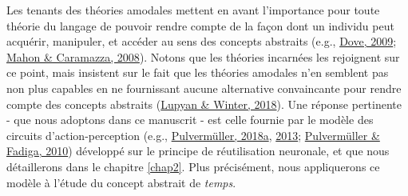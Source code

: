 \documentclass[
  a4paper,12pt,twoside,onecolumn,openright,final,oldfontcommands]{memoir}
\begin{document}
Les tenants des théories amodales mettent en avant l'importance pour toute théorie du langage de pouvoir rendre compte de la façon dont un individu peut acquérir, manipuler, et accéder au sens des concepts abstraits (e.g., \protect\hyperlink{ref-dove_beyond_2009}{Dove, 2009}; \protect\hyperlink{ref-mahon_critical_2008}{Mahon \& Caramazza, 2008}). Notons que les théories incarnées les rejoignent sur ce point, mais insistent sur le fait que les théories amodales n'en semblent pas non plus capables en ne fournissant aucune alternative convaincante pour rendre compte des concepts abstraits (\protect\hyperlink{ref-lupyan_language_2018}{Lupyan \& Winter, 2018}). Une réponse pertinente - que nous adoptons dans ce manuscrit - est celle fournie par le modèle des circuits d'action-perception (e.g., \protect\hyperlink{ref-pulvermuller_neural_2018}{Pulvermüller, 2018a}, \protect\hyperlink{ref-pulvermuller_how_2013}{2013}; \protect\hyperlink{ref-pulvermuller_active_2010}{Pulvermüller \& Fadiga, 2010}) développé sur le principe de réutilisation neuronale, et que nous détaillerons dans le chapitre \ref{chap2}. Plus précisément, nous appliquerons ce modèle à l'étude du concept abstrait de \emph{temps}.

\newpage
\end{document}
